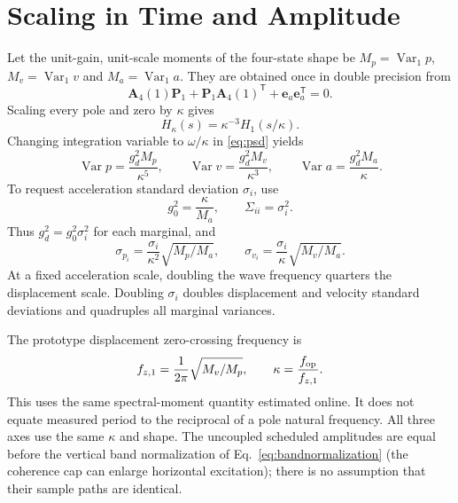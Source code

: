 \documentclass[conference]{IEEEtran}
\newcommand{\vc}[1]{\bm{#1}}
\newcommand{\mt}[1]{\bm{#1}}
\newcommand{\tr}{^{\mathsf T}}
\DeclareMathOperator{\Var}{Var}
\begin{document}
\section{Scaling in Time and Amplitude}
\label{sec:scaling}
Let the unit-gain, unit-scale moments of the four-state shape be
$M_p=\Var_1p$, $M_v=\Var_1v$ and $M_a=\Var_1a$. They are obtained once
in double precision from
\begin{equation}
 \mt A_4(1)\mt P_1+\mt P_1\mt A_4(1)\tr+
                  \vc e_a\vc e_a\tr=0.
 \label{eq:basecov}
\end{equation}
Scaling every pole and zero by $\kappa$ gives
\begin{equation}
 H_\kappa(s)=\kappa^{-3}H_1(s/\kappa).
 \label{eq:similarity}
\end{equation}
Changing integration variable to $\omega/\kappa$ in \cref{eq:psd} yields
\begin{equation}
 \Var p=\frac{g_d^2M_p}{\kappa^5},\qquad
 \Var v=\frac{g_d^2M_v}{\kappa^3},\qquad
 \Var a=\frac{g_d^2M_a}{\kappa}.
 \label{eq:momentscale}
\end{equation}
To request acceleration standard deviation $\sigma_i$, use
\begin{equation}
 g_0^2=\frac{\kappa}{M_a},\qquad \Sigma_{ii}=\sigma_i^2.
 \label{eq:gain}
\end{equation}
Thus $g_d^2=g_0^2\sigma_i^2$ for each marginal, and
\begin{equation}
 \sigma_{p_i}=\frac{\sigma_i}{\kappa^2}\sqrt{M_p/M_a},\qquad
 \sigma_{v_i}=\frac{\sigma_i}{\kappa}\sqrt{M_v/M_a}.
 \label{eq:motionstd}
\end{equation}
At a fixed acceleration scale, doubling the wave frequency quarters the
displacement scale. Doubling $\sigma_i$ doubles displacement and velocity
standard deviations and quadruples all marginal variances.

The prototype displacement zero-crossing frequency is
\begin{equation}
 f_{z,1}=\frac{1}{2\pi}\sqrt{M_v/M_p},\qquad
 \kappa=\frac{f_{\rm op}}{f_{z,1}}.
 \label{eq:kappa}
\end{equation}
This uses the same spectral-moment quantity estimated online. It does not
equate measured period to the reciprocal of a pole natural frequency.
All three axes use the same $\kappa$ and shape. The uncoupled scheduled amplitudes are
equal before the vertical band normalization of Eq.~\eqref{eq:bandnormalization}
(the coherence cap can enlarge
horizontal excitation); there is no assumption that their
sample paths are identical.
\end{document}

